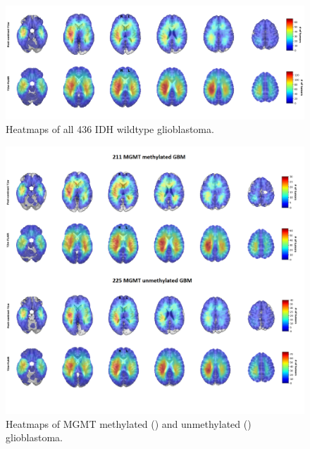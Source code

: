 \begin{figure}
    \centering
    \includegraphics[width=\textwidth]{Figures/Heatmap.png}

    \caption{Heatmaps of all 436 \acrshort{IDH} wildtype glioblastoma.}\label{fig:HGG_location_heatmap}
\end{figure}

\begin{figure}
    \centering
    \includegraphics[width=\textwidth]{Figures/Heatmap_MGMT_status.png}

    \caption{Heatmaps of \acrshort{MGMT} methylated () and unmethylated () glioblastoma.}\label{fig:HGG_location_heatmap_genetic}
\end{figure}


